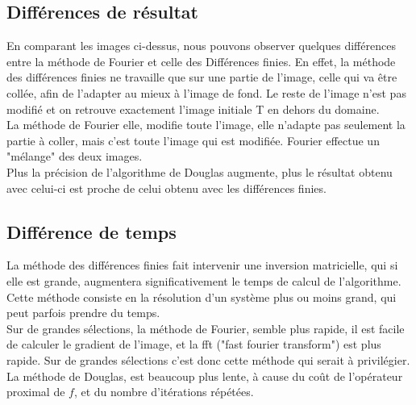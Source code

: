 \newpage
\subsection{Différences de résultat}
En comparant les images ci-dessus, nous pouvons observer quelques différences entre la méthode de Fourier et celle des Différences finies. En effet, la méthode des différences finies ne travaille que sur une partie de l'image, celle qui va être collée, afin de l'adapter au mieux à l'image de fond. Le reste de l'image n'est pas modifié et on retrouve exactement l'image initiale T en dehors du domaine. \\
La méthode de Fourier elle, modifie toute l'image, elle n'adapte pas seulement la partie à coller, mais c'est toute l'image qui est modifiée. Fourier effectue un "mélange" des deux images. \\
Plus la précision de l'algorithme de Douglas augmente, plus le résultat obtenu avec celui-ci est proche de celui obtenu avec les différences finies.
\subsection{Différence de temps}
La méthode des différences finies fait intervenir une inversion matricielle, qui si elle est grande, augmentera significativement le temps de calcul de l'algorithme. Cette méthode consiste en la résolution d'un système plus ou moins grand, qui peut parfois prendre du temps. \\
Sur de grandes sélections, la méthode de Fourier, semble plus rapide, il est facile de calculer le gradient de l'image, et la fft ("fast fourier transform") est plus rapide. Sur de grandes sélections c'est donc cette méthode qui serait à privilégier.\\
La méthode de Douglas, est beaucoup plus lente, à cause du coût de l'opérateur proximal de $f$, et du nombre d'itérations répétées.  
